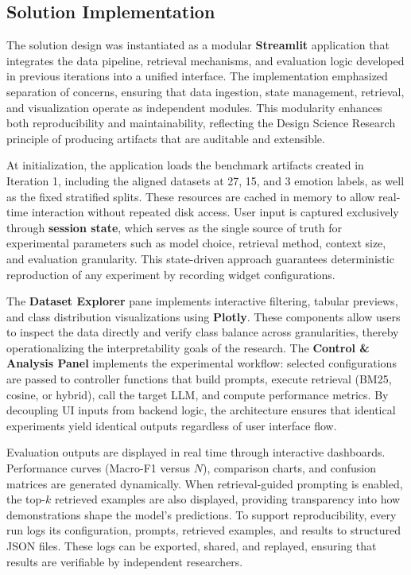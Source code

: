 \subsection{Solution Implementation}
\label{subsec:solution_implementation}

The solution design was instantiated as a modular \textbf{Streamlit} application that integrates the data pipeline, retrieval mechanisms, and evaluation logic developed in previous iterations into a unified interface. The implementation emphasized separation of concerns, ensuring that data ingestion, state management, retrieval, and visualization operate as independent modules. This modularity enhances both reproducibility and maintainability, reflecting the Design Science Research principle of producing artifacts that are auditable and extensible.

At initialization, the application loads the benchmark artifacts created in Iteration 1, including the aligned datasets at 27, 15, and 3 emotion labels, as well as the fixed stratified splits. These resources are cached in memory to allow real-time interaction without repeated disk access. User input is captured exclusively through \textbf{session state}, which serves as the single source of truth for experimental parameters such as model choice, retrieval method, context size, and evaluation granularity. This state-driven approach guarantees deterministic reproduction of any experiment by recording widget configurations.

The \textbf{Dataset Explorer} pane implements interactive filtering, tabular previews, and class distribution visualizations using \textbf{Plotly}. These components allow users to inspect the data directly and verify class balance across granularities, thereby operationalizing the interpretability goals of the research. The \textbf{Control \& Analysis Panel} implements the experimental workflow: selected configurations are passed to controller functions that build prompts, execute retrieval (BM25, cosine, or hybrid), call the target LLM, and compute performance metrics. By decoupling UI inputs from backend logic, the architecture ensures that identical experiments yield identical outputs regardless of user interface flow.

Evaluation outputs are displayed in real time through interactive dashboards. Performance curves (Macro-F1 versus $N$), comparison charts, and confusion matrices are generated dynamically. When retrieval-guided prompting is enabled, the top-$k$ retrieved examples are also displayed, providing transparency into how demonstrations shape the model’s predictions. To support reproducibility, every run logs its configuration, prompts, retrieved examples, and results to structured JSON files. These logs can be exported, shared, and replayed, ensuring that results are verifiable by independent researchers.

